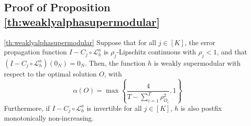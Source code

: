 \documentclass{article}
\begin{document}
\subsection{Proof of Proposition \ref{th:weaklyalphasupermodular}} \label{sec:proofweaklyalphasupermodular}



\begin{customproposition}{\ref{th:weaklyalphasupermodular}}
     Suppose that for all $j \in [K]$, the error propagation function $I - C_j \circ \mathcal{L}_h^a$ is $\rho_j$-Lipschitz continuous with $\rho_j < 1$, and that $(I - C_j \circ \mathcal{L}_h^a) (0_N) = 0_N$. Then, the function $h$ is weakly supermodular with respect to the optimal solution $O$, with 
     \begin{equation*}
         \alpha(O) = \max\left\{\frac{4}{T - \sum_{i = 1}^{T} \rho_{O_i}^2} , 1\right\}  
     \end{equation*}
     Furthermore, if $I - C_j \circ \mathcal{L}_h^a$ is invertible for all $j \in [K]$, $h$ is also postfix monotonically non-increasing.
\end{customproposition}
\end{document}

